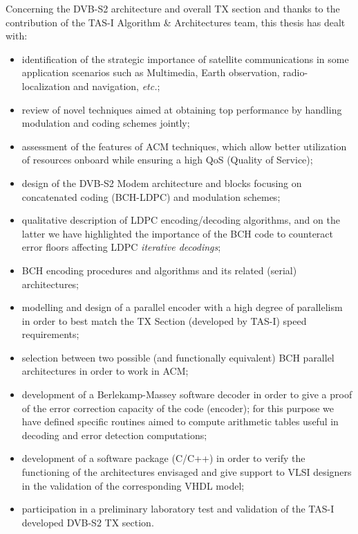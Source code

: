 Concerning the DVB-S2 architecture and overall TX section and thanks to the contribution of the TAS-I Algorithm \& Architectures team, this thesis has dealt with:
\begin{itemize}
\item identification of the strategic importance of satellite communications in some application scenarios such as Multimedia, Earth observation, radio-localization and navigation, \emph{etc.};
\item review of novel techniques aimed at obtaining top performance by handling modulation and coding schemes jointly;
\item assessment of the features of ACM techniques, which allow better utilization of resources onboard while ensuring a high QoS (Quality of Service);
\item design of the DVB-S2 Modem architecture and blocks focusing on concatenated coding (BCH-LDPC) and modulation schemes;
\item qualitative description of LDPC encoding/decoding algorithms, and on the latter we have highlighted the importance of the BCH code to counteract error floors affecting LDPC \emph{iterative decodings};
\item BCH encoding procedures and algorithms and its related (serial) architectures;
\item modelling and design of a parallel encoder with a high degree of parallelism in order to best match the TX Section (developed by TAS-I) speed requirements;
\item selection between two possible (and functionally equivalent) BCH parallel architectures in order to work in ACM;
\item development of a Berlekamp-Massey software decoder in order to give a proof of the error correction capacity of the code (encoder); for this purpose we have defined specific routines aimed to compute arithmetic tables useful in decoding and error detection computations;
\item development of a software package (C/C++) in order to verify the functioning of the architectures envisaged and give support to VLSI designers in the validation of the corresponding VHDL model;
\item participation in a preliminary laboratory test and validation of the TAS-I developed DVB-S2 TX section.
\end{itemize}

